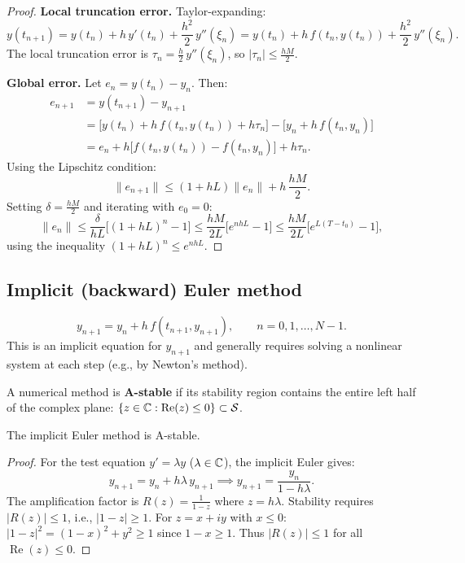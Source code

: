 \begin{proof}
\textbf{Local truncation error.} Taylor-expanding:
\[
    y(t_{n+1}) = y(t_n) + h\,y'(t_n) + \frac{h^2}{2}\,y''(\xi_n) = y(t_n) + h\,f(t_n, y(t_n)) + \frac{h^2}{2}\,y''(\xi_n).
\]
The local truncation error is $\tau_n = \frac{h}{2}\,y''(\xi_n)$, so $|\tau_n| \leq \frac{hM}{2}$.

\textbf{Global error.} Let $e_n = y(t_n) - y_n$. Then:
\begin{align*}
    e_{n+1} &= y(t_{n+1}) - y_{n+1} \\
    &= \bigl[y(t_n) + h\,f(t_n, y(t_n)) + h\tau_n\bigr] - \bigl[y_n + h\,f(t_n, y_n)\bigr] \\
    &= e_n + h\bigl[f(t_n, y(t_n)) - f(t_n, y_n)\bigr] + h\tau_n.
\end{align*}
Using the Lipschitz condition:
\[
    \|e_{n+1}\| \leq (1 + hL)\|e_n\| + h\,\frac{hM}{2}.
\]
Setting $\delta = \frac{hM}{2}$ and iterating with $e_0 = 0$:
\[
    \|e_n\| \leq \frac{\delta}{hL}\bigl[(1+hL)^n - 1\bigr] \leq \frac{hM}{2L}\bigl[e^{nhL} - 1\bigr] \leq \frac{hM}{2L}\bigl[e^{L(T-t_0)} - 1\bigr],
\]
using the inequality $(1+hL)^n \leq e^{nhL}$.
\end{proof}

\subsection{Implicit (backward) Euler method}

\begin{definition}
\label{def:euler-implicit}
\[
    y_{n+1} = y_n + h\,f(t_{n+1}, y_{n+1}), \qquad n = 0, 1, \ldots, N-1.
\]
This is an implicit equation for $y_{n+1}$ and generally requires solving a nonlinear system at each step (e.g., by Newton's method).
\end{definition}

\begin{definition}[A-stability]
\label{def:A-stability}
A numerical method is \textbf{A-stable} if its stability region contains the entire left half of the complex plane: $\{z \in \mathbb{C} : \operatorname{Re}(z) \leq 0\} \subset \mathcal{S}$.
\end{definition}

\begin{theorem}
\label{thm:implicit-euler-Astable}
The implicit Euler method is A-stable.
\end{theorem}

\begin{proof}
For the test equation $y' = \lambda y$ ($\lambda \in \mathbb{C}$), the implicit Euler gives:
\[
    y_{n+1} = y_n + h\lambda\,y_{n+1} \implies y_{n+1} = \frac{y_n}{1 - h\lambda}.
\]
The amplification factor is $R(z) = \frac{1}{1-z}$ where $z = h\lambda$. Stability requires $|R(z)| \leq 1$, i.e., $|1-z| \geq 1$. For $z = x + iy$ with $x \leq 0$: $|1-z|^2 = (1-x)^2 + y^2 \geq 1$ since $1-x \geq 1$. Thus $|R(z)| \leq 1$ for all $\operatorname{Re}(z) \leq 0$.
\end{proof}

